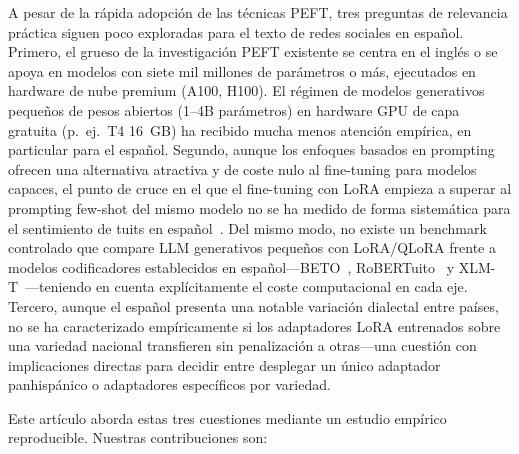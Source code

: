 \documentclass[conference]{IEEEtran}
\begin{document}
A pesar de la rápida adopción de las técnicas PEFT, tres preguntas de relevancia
práctica siguen poco exploradas para el texto de redes sociales en español.
Primero, el grueso de la investigación PEFT existente se centra en el inglés o
se apoya en modelos con siete mil millones de parámetros o más, ejecutados en
hardware de nube premium (A100, H100).
El régimen de modelos generativos pequeños de pesos abiertos (1--4B parámetros)
en hardware GPU de capa gratuita (p.\ ej.\ T4 16~GB) ha recibido mucha menos
atención empírica, en particular para el español.
Segundo, aunque los enfoques basados en prompting ofrecen una alternativa
atractiva y de coste nulo al fine-tuning para modelos capaces, el punto de cruce
en el que el fine-tuning con LoRA empieza a superar al prompting few-shot del
mismo modelo no se ha medido de forma sistemática para el sentimiento de tuits
en español~\cite{mosbach2023fewshot,min2022rethinking}.
Del mismo modo, no existe un benchmark controlado que compare LLM generativos
pequeños con LoRA/QLoRA frente a modelos codificadores establecidos en
español---BETO~\cite{canete2020beto},
RoBERTuito~\cite{perez2022robertuito} y XLM-T~\cite{barbieri2022xlmt}---teniendo
en cuenta explícitamente el coste computacional en cada eje.
Tercero, aunque el español presenta una notable variación dialectal entre países,
no se ha caracterizado empíricamente si los adaptadores LoRA entrenados sobre una
variedad nacional transfieren sin penalización a otras---una cuestión con
implicaciones directas para decidir entre desplegar un único adaptador
panhispánico o adaptadores específicos por variedad.

Este artículo aborda estas tres cuestiones mediante un estudio empírico reproducible.
Nuestras contribuciones son:
\end{document}
